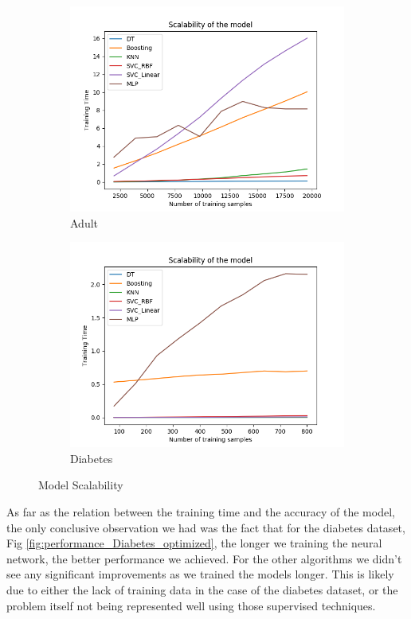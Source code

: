 \documentclass[11pt, twocolumn]{article}
\begin{document}
    \begin{figure}[!htbp]
        \begin{subfigure}{.24\textwidth}
            \centering
            \includegraphics[width=.9\textwidth]{scalability_Adult_optimized}
            \caption{Adult}
            \label{fig:scalability_Adult_optimized}
        \end{subfigure}
        \begin{subfigure}{.24\textwidth}
            \centering
            \includegraphics[width=.9\textwidth]{scalability_Diabetes_optimized}
            \caption{Diabetes}
            \label{fig:scalability_Diabetes_optimized}
        \end{subfigure}
        \caption{Model Scalability}
    \end{figure}
    \FloatBarrier

    As far as the relation between the training time and the accuracy of the model, the only conclusive observation we had was the fact that for the diabetes dataset, Fig \ref{fig:performance_Diabetes_optimized}, the longer we training the neural network, the better performance we achieved. For the other algorithms we didn't see any significant improvements as we trained the models longer. This is likely due to either the lack of training data in the case of the diabetes dataset, or the problem itself not being represented well using those supervised techniques.
\end{document}
